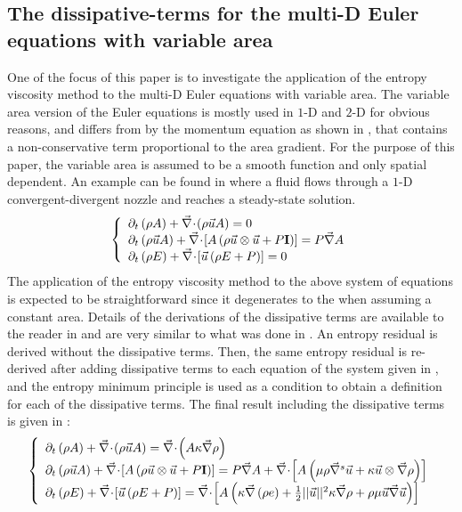 \subsection{The dissipative-terms for the multi-D Euler equations with variable area} 
One of the focus of this paper is to investigate the application of the entropy viscosity method to the multi-D Euler equations with variable area. The variable area version of the Euler equations is mostly used in $1$-D and $2$-D for obvious reasons, and differs from  by the momentum equation as shown in , that contains a non-conservative term proportional to the area gradient. For the purpose of this paper, the variable area is assumed to be a smooth function and only spatial dependent. An example can be found in \cite{SEM} where a fluid flows through a $1$-D convergent-divergent nozzle and reaches a steady-state solution.
\begin{equation}
\label{eq:euler_variable_A}
\left\{ 
\begin{array}{lll}
\partial_t \left( \rho A \right) + \vec{\nabla}\! \cdot \! \left( \rho \vec{u} A \right) = 0 \\
\partial_t \left( \rho \vec{u} A \right) + \vec{\nabla}\! \cdot \! \left[A\left( \rho \vec{u} \otimes \vec{u} + P \mathbf{I} \right) \right] = P \vec{\nabla} A \\
\partial_t \left( \rho E \right) + \vec{\nabla}\! \cdot \! \left[ \vec{u} \left( \rho E + P \right) \right] = 0
\end{array}
\right.
\end{equation}
The application of the entropy viscosity method to the above system of equations is expected to be straightforward since it degenerates to the  when assuming a constant area. Details of the derivations of the dissipative terms are available to the reader in  and are very similar to what was done in \cite{jlg}. An entropy residual is derived without the dissipative terms. Then, the same entropy residual is re-derived after adding dissipative terms to each equation of the system given in , and the entropy minimum principle is used as a condition to obtain a definition for each of the dissipative terms. The final result including the dissipative terms is given in :
\begin{equation}
\label{eq:euler_variable_A_bis}
\left\{ 
\begin{array}{lll}
\partial_t \left( \rho A \right) + \div \left( \rho \vec{u} A \right) = \div \left( A \kappa \grad \rho \right) \\
\partial_t \left( \rho \vec{u} A \right) + \div \left[A\left( \rho \vec{u} \otimes \vec{u} + P \mathbf{I} \right) \right] = P \grad A + \div \left[ A \left( \mu \rho \grad^s \vec{u}  + \kappa \vec{u} \otimes \grad \rho \right) \right]\\
\partial_t \left( \rho E \right) + \div \left[ \vec{u} \left( \rho E + P \right) \right] = \div \left[ A \left( \kappa \grad \left( \rho e \right) + \frac{1}{2}|| \vec{u} ||^2 \kappa \grad \rho +  \rho \mu \vec{u} \grad \vec{u}  \right) \right]
\end{array}
\right.
\end{equation}
